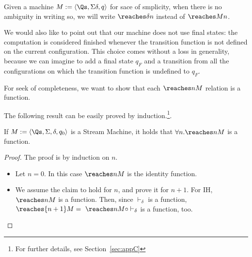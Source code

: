 \begin{conditional}{\notappendix}
    \begin{notation}
      Given a machine $M := \langle \Qs, \Sigma \delta,q \rangle$ for sace of smplicity,
      when there is no ambiguity in writing so, we will write $\reaches \delta n$
      instead of $\reaches M n$.
    \end{notation}

    We would also like to point out that
    our machine does not use final states: the computation
    is considered finished whenever the transition function is not defined on
    the current configuration. This choice comes without a loss in generality,
    because we can imagine
    to add a final state $q_F$ and a transition from all the configurations
    on which the transition function is undefined to $q_F$.

    For seek of completeness, we want to show that each $\reaches n M$ relation
    is a function.
  \end{conditional}

  \begin{conditional}{\shortonly}
    The following result can be easily proved by induction.\footnote{For
    further details, see Section~\ref{sec:appC}}.
  \end{conditional}

  \begin{remark} If $M:=\langle \Qs,
  \Sigma, \delta, q_0\rangle$ is a Stream Machine, it holds that
  $\forall n.\reaches n M$ is
  a function.
\end{remark}


  \begin{conditional}{\appendixorsup}
    \begin{proof}
    The proof is by induction on $n$.
    \begin{itemize}
    \itemsep0em
    \item Let $n=0$. In this case $\reaches n M$
    is the identity function.

    \item We assume the claim to hold for $n$, and
    prove it for $n+1$. For IH, $\reaches n M$
    is a function. Then, since
    $\vdash_{\delta}$ is a function,  $\reaches {n+1} M
    = \ \reaches n M \circ
    \vdash_{\delta}$ is a function, too.

    \end{itemize}
    \end{proof}
  \end{conditional}

